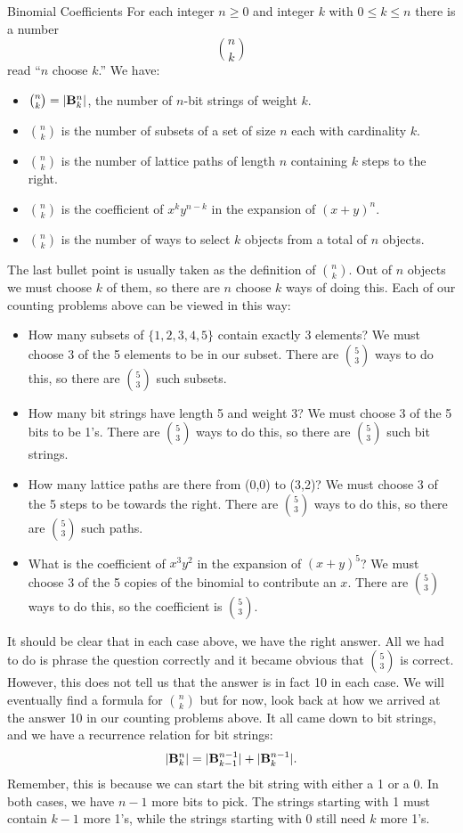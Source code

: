 \documentclass[12pt]{article}
\begin{document}
\begin{defbox}{Binomial Coefficients}
  For each integer $n \ge 0$ and integer $k$ with $0 \le k \le n$ there is a number
  \[{n\choose k}  \]
  read ``$n$ choose $k$.''  We have:
  \begin{itemize}
    \item ${n\choose k} = |\mathbf{B}^n_k|$, the number of $n$-bit strings of weight $k$.
    \item ${n \choose k}$ is the number of subsets of a set of size $n$ each with cardinality $k$.
    \item ${n \choose k}$ is the number of lattice paths of length $n$ containing $k$ steps to the right.
    \item ${n \choose k}$ is the coefficient of $x^ky^{n-k}$ in the expansion of $(x+y)^n$.
    \item ${n \choose k}$ is the number of ways to select $k$ objects from a total of $n$ objects.
  \end{itemize}
\end{defbox}

The last bullet point is usually taken as the definition of ${n \choose k}$.  Out of $n$ objects we must choose $k$ of them, so there are $n$ choose $k$ ways of doing this.  Each of our counting problems above can be viewed in this way:
\begin{itemize}
  \item How many subsets of $\{1,2,3,4,5\}$ contain exactly 3 elements?  We must choose $3$ of the 5 elements to be in our subset.  There are ${5 \choose 3}$ ways to do this, so there are ${5 \choose 3}$ such subsets.
  \item How many bit strings have length 5 and weight 3?  We must choose $3$ of the 5 bits to be 1's.  There are ${5 \choose 3}$ ways to do this, so there are ${5 \choose 3}$ such bit strings.
  \item How many lattice paths are there from (0,0) to (3,2)?  We must choose 3 of the 5 steps to be towards the right.  There are ${5 \choose 3}$ ways to do this, so there are ${5 \choose 3}$ such paths.
  \item What is the coefficient of $x^3y^2$ in the expansion of $(x+y)^5$?  We must choose 3 of the 5 copies of the binomial to contribute an $x$.  There are ${5 \choose 3}$ ways to do this, so the coefficient is ${5 \choose 3}$.
\end{itemize}

It should be clear that in each case above, we have the right answer.  All we had to do is phrase the question correctly and it became obvious that ${5 \choose 3}$ is correct.  However, this does not tell us that the answer is in fact 10 in each case.  We will eventually find a formula for ${n \choose k}$ but for now, look back at how we arrived at the answer 10 in our counting problems above.  It all came down to bit strings, and we have a recurrence relation for bit strings:
\[|\mathbf{B}^n_k| = |\mathbf{B}^{n-1}_{k-1}| + |\mathbf{B}^{n-1}_k|.\]
Remember, this is because we can start the bit string with either a 1 or a 0.  In both cases, we have $n-1$ more bits to pick.  The strings starting with 1 must contain $k-1$ more 1's, while the strings starting with 0 still need $k$ more 1's.
\end{document}
